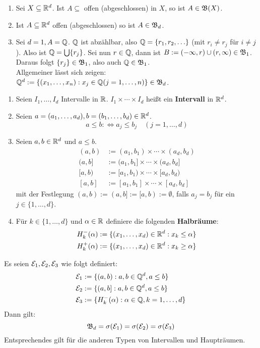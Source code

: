 \documentclass[a4paper,twoside,DIV15,BCOR12mm,chapterprefix=true,headings=onelinechapter]{scrbook}
\begin{document}
\begin{beispiel}
\begin{enumerate}
\item Sei $X\subseteq\mathbb{R}^d$. Ist $A\subseteq$ offen (abgeschlossen) in $X$, so ist $A\in\mathfrak{B}(X)$.
\item Ist $A\subseteq\mathbb{R}^d$ offen (abgeschlossen) so ist $A\in\mathfrak{B}_d$.
\item Sei $d=1, A=\mathbb{Q}$. $\mathbb{Q}$ ist abzählbar, also $\mathbb{Q}=\{r_1,r_2,\ldots\}$ (mit $r_i\ne r_j$ für $i\ne j$). Also ist $\mathbb{Q}=\bigcup \{r_j\}$. Sei nun $r\in\mathbb{Q}$, dann ist $B:=(-\infty,r)\cup(r,\infty)\in\mathfrak{B}_1$. Daraus folgt $\{r_j\}\in\mathfrak{B}_1$, also auch $\mathbb{Q}\in\mathfrak{B}_1$.\\
Allgemeiner lässt sich zeigen: $\mathbb{Q}^d:=\{(x_1,\ldots,x_n):x_j\in\mathbb{Q} (j=1,\ldots,n)\}\in\mathfrak{B}_d$.
\end{enumerate}
\end{beispiel}

\begin{definition}
\begin{enumerate}
\item Seien $I_1,\ldots,I_d$ Intervalle in $\mathbb{R}$. $I_1\times\cdots\times I_d$ heißt ein \textbf{Intervall} in $\mathbb{R}^d$.
\item Seien $a=(a_1,\ldots,a_d), b=(b_1,\ldots,b_d)\in\mathbb{R}^d$.
\[a\le b:\iff a_j\le b_j\quad (j=1,\ldots,d)\]
\item Seien $a,b\in\mathbb{R}^d$ und $a\le b$.
\begin{align*}
(a,b)&:=(a_1,b_1)\times\cdots\times(a_d,b_d)\\
(a,b]&:=(a_1,b_1]\times\cdots\times(a_d,b_d]\\
[a,b)&:=[a_1,b_1)\times\cdots\times[a_d,b_d)\\
[a,b]&:=[a_1,b_1]\times\cdots\times[a_d,b_d]
\end{align*}
mit der Festlegung $(a,b):=(a,b]:=[a,b):=\emptyset$, falls $a_j=b_j$ für ein $j\in\{1,\ldots,d\}$.
\item Für $k\in\{1,\ldots,d\}$ und $\alpha\in\mathbb{R}$ definiere die folgenden \textbf{Halbräume}:
\begin{align*}
H_k^-(\alpha):=\{(x_1,\ldots,x_d)\in\mathbb{R}^d:x_k\le\alpha\}\\
H_k^+(\alpha):=\{(x_1,\ldots,x_d)\in\mathbb{R}^d:x_k\ge\alpha\}
\end{align*}
\end{enumerate}
\end{definition}

\begin{satz}
Es seien $\mathcal{E}_1,\mathcal{E}_2,\mathcal{E}_3$ wie folgt definiert:
\begin{align*}
\mathcal{E}_1&:=\{(a,b):a,b\in\mathbb{Q}^d,a\le b\}\\
\mathcal{E}_2&:=\{(a,b]:a,b\in\mathbb{Q}^d, a\le b\}\\
\mathcal{E}_3&:=\{H^-_k(\alpha):\alpha\in\mathbb{Q}, k=1,\ldots,d\}
\end{align*}
Dann gilt:
\[\mathfrak{B}_d=\sigma(\mathcal{E}_1)=\sigma(\mathcal{E}_2)=\sigma(\mathcal{E}_3)\]
Entsprechendes gilt für die anderen Typen von Intervallen und Haupträumen.
\end{satz}
\end{document}
